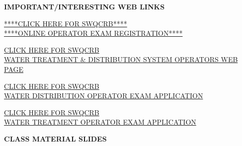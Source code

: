 \documentclass{article}
\begin{document}
 
\textbf{IMPORTANT/INTERESTING WEB LINKS}
\begin{tcolorbox}[width=17cm,box align=center, halign=center,  valign=center,colback={my-blue},title={}, colbacktitle=yellow,coltitle=blue]    
\href{https://wbapps.waterboards.ca.gov/opcert/}{****CLICK HERE FOR SWQCRB****\\ ****ONLINE OPERATOR EXAM REGISTRATION****}
\end{tcolorbox} 
\begin{tcolorbox}[width=17cm,box align=center, halign=center,  valign=center,colback={my-blue},title={}, colbacktitle=yellow,coltitle=blue]    
\href{https://www.waterboards.ca.gov/drinking_water/certlic/occupations/DWopcert.html}{CLICK HERE FOR SWQCRB\\ WATER TREATMENT \& DISTRIBUTION SYSTEM OPERATORS WEB PAGE}
\end{tcolorbox} 
\begin{tcolorbox}[width=17cm,box align=center, halign=center,  valign=center,colback={my-blue},title={}, colbacktitle=yellow,coltitle=blue]    
\href{https://www.waterboards.ca.gov/drinking_water/certlic/occupations/documents/opcert/2014/dw_dis_exam_app.pdf}{CLICK HERE FOR SWQCRB\\ WATER DISTRIBUTION OPERATOR EXAM APPLICATION}
\end{tcolorbox} 
\begin{tcolorbox}[width=17cm,box align=center, halign=center,  valign=center,colback={my-blue},title={}, colbacktitle=yellow,coltitle=blue]    
\href{https://www.waterboards.ca.gov/drinking_water/certlic/occupations/documents/opcert/treatment_exam.pdf}{CLICK HERE FOR SWQCRB\\ WATER TREATMENT OPERATOR EXAM APPLICATION}
\end{tcolorbox} 

%
%

\textbf{CLASS MATERIAL SLIDES}
\end{document}

